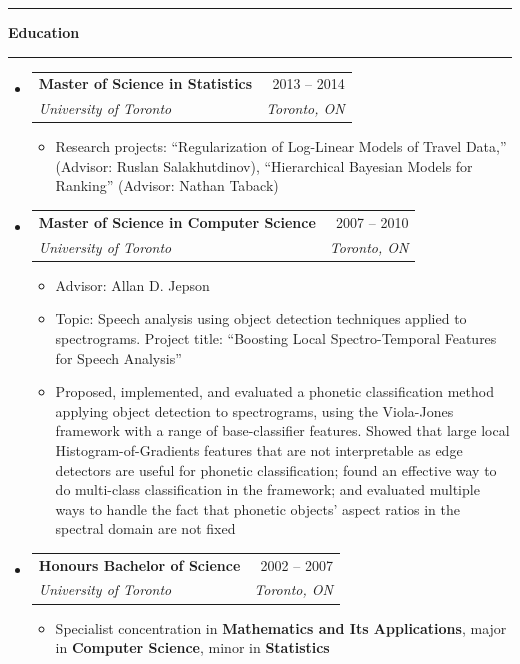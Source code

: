 \documentclass[letterpaper,11pt]{article}
\makeatletter
\newcommand{\resitem}[1]{\item #1 \vspace{-2pt}}
\newcommand{\resheading}[1]{%
  \vspace{10pt}%
  \noindent\textcolor{accent}{\rule{3pt}{12pt}}\hspace{6pt}%
  {\large \textbf{\textcolor{accent}{#1}}}%
  \vspace{2pt}%
  \par\noindent\textcolor{accent!30}{\rule{\textwidth}{0.5pt}}%
  \vspace{2pt}%
}
\newcommand{\ressubheading}[4]{
\begin{tabular*}{\linewidth}[t]{l@{\extracolsep{\fill}}r}
		\textbf{#1} & #2 \\
		\textit{\textcolor{accent}{#3}} & \textit{#4} \\
\end{tabular*}\vspace{-2pt}}
\makeatother
\begin{document}
\resheading{Education}
\begin{itemize}
\item
	\ressubheading{Master of Science in Statistics}{2013 -- 2014 }{University of Toronto}{Toronto, ON}
	\begin{itemize}
		\resitem{Research projects: ``Regularization of Log-Linear Models of Travel Data,''  (Advisor: Ruslan Salakhutdinov), ``Hierarchical Bayesian Models for Ranking'' (Advisor: Nathan Taback)}
	\end{itemize}

\item
	\ressubheading{Master of Science in Computer Science}{2007 -- 2010}{University of Toronto}{Toronto, ON}
	\begin{itemize}
		\resitem{Advisor: Allan D. Jepson}
		\resitem{Topic: Speech analysis using object detection techniques applied to spectrograms. Project title: ``Boosting Local Spectro-Temporal Features for Speech Analysis''}
		\resitem{Proposed, implemented, and evaluated a phonetic classification method applying object detection to spectrograms, using the Viola-Jones framework with a range of base-classifier features. Showed that large local Histogram-of-Gradients features that are not interpretable as edge detectors are useful for phonetic classification; found an effective way to do multi-class classification in the framework; and evaluated multiple ways to handle the fact that phonetic objects' aspect ratios in the spectral domain are not fixed}
	\end{itemize}

\item
	\ressubheading{Honours Bachelor of Science}{2002 -- 2007}{University of Toronto}{Toronto, ON}
	\begin{itemize}
		\resitem{Specialist concentration in \textbf{Mathematics and Its Applications}, major in \textbf{Computer Science}, minor in \textbf{Statistics}}
	\end{itemize}

\end{itemize}
\end{document}
